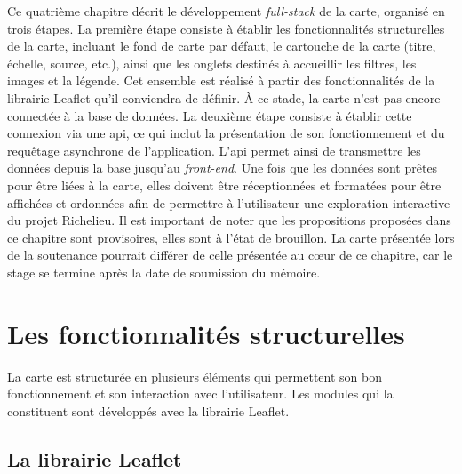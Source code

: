 Ce quatrième chapitre décrit le développement \textit{full-stack} de la carte, organisé en trois étapes. La première étape consiste à établir les fonctionnalités structurelles de la carte, incluant le fond de carte par défaut, le cartouche de la carte (titre, échelle, source, etc.), ainsi que les onglets destinés à accueillir les filtres, les images et la légende. Cet ensemble est réalisé à partir des fonctionnalités de la librairie Leaflet qu'il conviendra de définir. À ce stade, la carte n'est pas encore connectée à la base de données. La deuxième étape consiste à établir cette connexion via une \acrshort{api}, ce qui inclut la présentation de son fonctionnement et du requêtage asynchrone de l'application. L'\acrshort{api} permet ainsi de transmettre les données depuis la base jusqu'au \textit{front-end}. Une fois que les données sont prêtes pour être liées à la carte, elles doivent être réceptionnées et formatées pour être affichées et ordonnées afin de permettre à l'utilisateur une exploration interactive du projet Richelieu.  Il est important de noter que les propositions proposées dans ce chapitre sont provisoires, elles sont à l'état de brouillon. La carte présentée lors de la soutenance pourrait différer de celle présentée au cœur de ce chapitre, car le stage se termine après la date de soumission du mémoire.


\section{Les fonctionnalités structurelles}
La carte est structurée en plusieurs éléments qui permettent son bon fonctionnement et son interaction avec l'utilisateur. Les modules qui la constituent sont développés avec la librairie Leaflet. 
\subsection{La librairie Leaflet}
